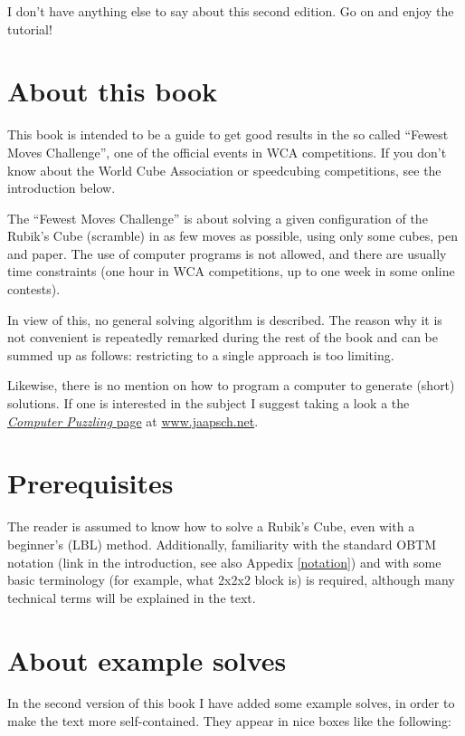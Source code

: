 \documentclass[11pt,a4paper]{book}
\begin{document}
I don't have anything else to say about this second edition. Go on and enjoy the tutorial!

\newpage

\section*{About this book}

This book is intended to be a guide to get good results in the so called ``Fewest Moves Challenge'', one of the official events in WCA competitions. If you don't know about the World Cube Association or speedcubing competitions, see the introduction below.

The ``Fewest Moves Challenge'' is about solving a given configuration of the Rubik's Cube (scramble) in as few moves as possible, using only some cubes, pen and paper. The use of computer programs is not allowed, and there are usually time constraints (one hour in WCA competitions, up to one week in some online contests).

In view of this, no general solving algorithm is described. The reason why it is not convenient is repeatedly remarked during the rest of the book and can be summed up as follows: restricting to a single approach is too limiting.

Likewise, there is no mention on how to program a computer to generate (short) solutions. If one is interested in the subject I suggest taking a look a the \href{https://www.jaapsch.net/puzzles/compcube.htm}{\emph{Computer Puzzling} page} at \url{www.jaapsch.net}.

\section*{Prerequisites}

The reader is assumed to know how to solve a Rubik's Cube, even with a beginner's (LBL) method. Additionally, familiarity with the standard OBTM notation (link in the introduction, see also Appedix \ref{notation}) and with some basic terminology (for example, what 2x2x2 block is) is required, although many technical terms will be explained in the text.

\section*{About example solves}

In the second version of this book I have added some example solves, in order to make the text more self-contained. They appear in nice boxes like the following:
\end{document}

